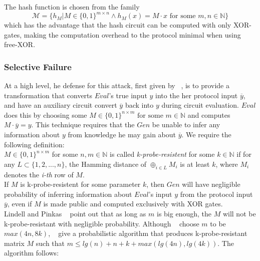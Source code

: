 \documentclass{article}
\begin{document}
The hash function is chosen from the family $$\mathcal{M} = \{ h_{M} | M \in \{0,1\}^{m \times n} \wedge h_{M}(x) = M \cdot x \text{ for some } m,n \in \mathbb{N} \}$$
which has the advantage that the hash circuit can be computed with only XOR-gates, making the computation overhead to the protocol minimal when using free-XOR.

\subsubsection{Selective Failure} \label{sec:selective-failure-defense}

At a high level, he defense for this attack, first given by ~\cite{LP07}, is to provide a transformation that converts $Eval$'s true input $y$ into the her protocol input $\overline{y}$, and have an auxiliary circuit convert $\overline{y}$ back into $y$ during circuit evaluation. $Eval$ does this by choosing some $M \in \{0,1\}^{n \times m} \text{ for some } m \in \mathbb{N}$ and computes $M \cdot \overline{y} = y$. This technique requires that the $Gen$ be unable to infer any information about $y$ from knowledge he may gain about $\overline{y}$.  We require the following definition:\\

$M \in \{0,1\}^{n \times m}$ for some $n,m \in \mathbb{N}$  is called \emph{k-probe-resistent} for some $k \in \mathbb{N}$ if for any $L \subset \{1,2,...,n\}$, the Hamming distance of $\oplus_{i \in L} M_{i} $ is at least $k$, where $M_{i}$ denotes the \emph{i-th} row of $M$.\\

If $M$ is k-probe-resistent for some parameter $k$, then $Gen$ will have negligible probability of inferring information about $Eval$'s input $y$ from the protocol input $\overline{y}$, even if $M$ is made public and computed exclusively with XOR gates. \\

Lindell and Pinkas ~\cite{LP07} point out that as long as $m$ is big enough, the $M$ will not be k-probe-resistant with negligible probability. Although ~\cite{LP07} choose $m$ to be $max(4n,8k)$, ~\cite{fast2pc} give a probabilistic algorithm that produces k-probe-resistant matrix $M$ such that $m \leq lg(n) + n + k + max(lg(4n),lg(4k))$. The algorithm follows:
\end{document}
